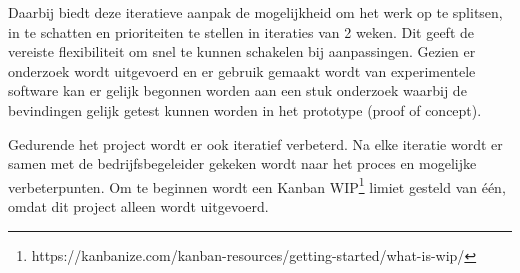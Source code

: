 Daarbij biedt deze iteratieve aanpak de mogelijkheid om het werk op te splitsen, in te schatten en prioriteiten te stellen in iteraties van 2 weken. Dit geeft de vereiste flexibiliteit om snel te kunnen schakelen bij aanpassingen. Gezien er onderzoek wordt uitgevoerd en er gebruik gemaakt wordt van experimentele software kan er gelijk begonnen worden aan een stuk onderzoek waarbij de bevindingen gelijk getest kunnen worden in het prototype (proof of concept).\par

Gedurende het project wordt er ook iteratief verbeterd. Na elke iteratie wordt er samen met de bedrijfsbegeleider gekeken wordt naar het proces en mogelijke verbeterpunten. Om te beginnen wordt een Kanban WIP\footnote{https://kanbanize.com/kanban-resources/getting-started/what-is-wip/} limiet gesteld van één, omdat dit project alleen wordt uitgevoerd.